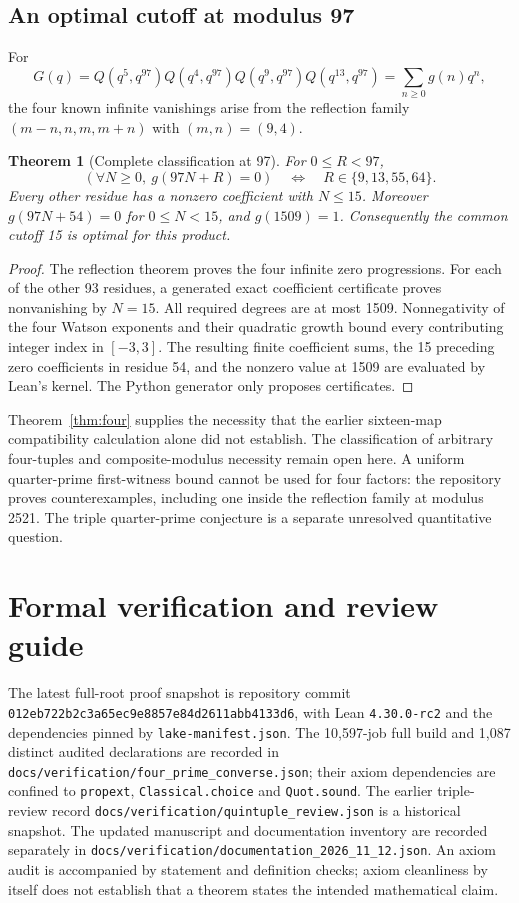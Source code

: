 \documentclass[11pt]{amsart}
\newcommand{\lean}[1]{{\small\nolinkurl{#1}}}
\newtheorem{theorem}{Theorem}
\theoremstyle{definition}
\begin{document}
\subsection{An optimal cutoff at modulus 97}
For
\[
 G(q)=Q(q^5,q^{97})Q(q^4,q^{97})Q(q^9,q^{97})Q(q^{13},q^{97})
      =\sum_{n\ge0}g(n)q^n,
\]
the four known infinite vanishings arise from the reflection family
$(m-n,n,m,m+n)$ with $(m,n)=(9,4)$.
\begin{samepage}
\begin{theorem}[Complete classification at 97]\label{thm:97}
For $0\le R<97$,
\[
 (\forall N\ge0,\ g(97N+R)=0)
 \quad\Longleftrightarrow\quad R\in\{9,13,55,64\}.
\]
Every other residue has a nonzero coefficient with $N\le15$.
Moreover $g(97N+54)=0$ for $0\le N<15$, and $g(1509)=1$.
Consequently the common cutoff 15 is optimal for this product.
\end{theorem}
\end{samepage}
\begin{proof}
The reflection theorem proves the four infinite zero progressions.
For each of the other 93 residues, a generated exact coefficient
certificate proves nonvanishing by $N=15$. All required degrees are at
most 1509. Nonnegativity of the four Watson exponents and their quadratic
growth bound every contributing integer index in $[-3,3]$.
The resulting finite coefficient sums, the 15 preceding zero coefficients
in residue 54, and the nonzero value at 1509 are evaluated by Lean's kernel.
The Python generator only proposes certificates.
\end{proof}

Theorem~\ref{thm:four} supplies the necessity that the earlier
sixteen-map compatibility calculation alone did not establish. The
classification of arbitrary four-tuples and composite-modulus necessity
remain open here. A uniform quarter-prime first-witness bound cannot
be used for four factors: the repository proves counterexamples, including
one inside the reflection family at modulus 2521. The triple
quarter-prime conjecture is a separate unresolved quantitative question.

\section{Formal verification and review guide}
The latest full-root proof snapshot is repository commit
\lean{012eb722b2c3a65ec9e8857e84d2611abb4133d6}, with Lean
\texttt{4.30.0-rc2} and the dependencies pinned by \lean{lake-manifest.json}.
The 10,597-job full build and 1,087 distinct audited declarations are
recorded in \lean{docs/verification/four_prime_converse.json}; their axiom
dependencies are confined to \lean{propext}, \lean{Classical.choice} and
\lean{Quot.sound}. The earlier triple-review record
\lean{docs/verification/quintuple_review.json} is a historical snapshot.
The updated manuscript and documentation inventory are recorded separately
in \lean{docs/verification/documentation_2026_11_12.json}.
An axiom audit is accompanied by statement and definition checks;
axiom cleanliness by itself does not establish that a theorem states
the intended mathematical claim.
\end{document}
